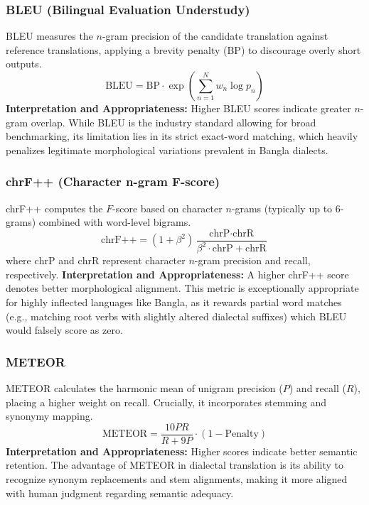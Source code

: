 \documentclass[12pt,a4paper]{article}
\begin{document}
\subsubsection{BLEU (Bilingual Evaluation Understudy)}
BLEU \cite{papineni2002bleu} measures the $n$-gram precision of the candidate translation against reference translations, applying a brevity penalty (BP) to discourage overly short outputs. 
\begin{equation}
\text{BLEU} = \text{BP} \cdot \exp\left( \sum_{n=1}^N w_n \log p_n \right)
\end{equation}
\textbf{Interpretation and Appropriateness:} Higher BLEU scores indicate greater $n$-gram overlap. While BLEU is the industry standard allowing for broad benchmarking, its limitation lies in its strict exact-word matching, which heavily penalizes legitimate morphological variations prevalent in Bangla dialects.

\subsubsection{chrF++ (Character n-gram F-score)}
chrF++ \cite{popovic2015chrf} computes the $F$-score based on character $n$-grams (typically up to 6-grams) combined with word-level bigrams.
\begin{equation}
\text{chrF++} = \left( 1 + \beta^2 \right) \frac{\text{chrP} \cdot \text{chrR}}{\beta^2 \cdot \text{chrP} + \text{chrR}}
\end{equation}
where $\text{chrP}$ and $\text{chrR}$ represent character $n$-gram precision and recall, respectively.
\textbf{Interpretation and Appropriateness:} A higher chrF++ score denotes better morphological alignment. This metric is exceptionally appropriate for highly inflected languages like Bangla, as it rewards partial word matches (e.g., matching root verbs with slightly altered dialectal suffixes) which BLEU would falsely score as zero.

\subsubsection{METEOR}
METEOR \cite{banerjee2005meteor} calculates the harmonic mean of unigram precision ($P$) and recall ($R$), placing a higher weight on recall. Crucially, it incorporates stemming and synonymy mapping.
\begin{equation}
\text{METEOR} = \frac{10 P R}{R + 9 P} \cdot (1 - \text{Penalty})
\end{equation}
\textbf{Interpretation and Appropriateness:} Higher scores indicate better semantic retention. The advantage of METEOR in dialectal translation is its ability to recognize synonym replacements and stem alignments, making it more aligned with human judgment regarding semantic adequacy.
\end{document}
